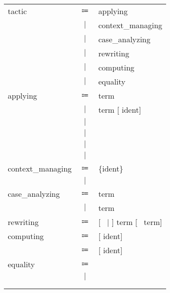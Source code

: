 \begin{table}[!htb]
    \centering\sl
    \begin{tabular}{lcl}
        tactic
            &$\Coloneqq$&applying\\
            &$\mid$&context\_managing\\
            &$\mid$&case\_analyzing\\
            &$\mid$&rewriting\\
            &$\mid$&computing\\
            &$\mid$&equality\\
        applying
            &$\Coloneqq$&\fexact{} term\\
            &$\mid$&\fapply{} term [\fin{} ident]\\
            &$\mid$&\fleft{}\\
            &$\mid$&\fright{}\\
            &$\mid$&\fsplit{}\\
            &$\mid$&\fexists{}\\
        context\_managing
            &$\Coloneqq$&\fintro{} \{ident\}\\
            &$\mid$&\fintros{}\\
        case\_analyzing
            &$\Coloneqq$&\fdestruct{} term\\
            &$\mid$&\finduction{} term\\
        rewriting
            &$\Coloneqq$&\frewrite{} [~\larrow{} $\mid$ \sarrow{}] term [~\fin{} term]\\
        computing
            &$\Coloneqq$&\fsimpl{} [\fin{} ident]\\
            &$\Coloneqq$&\funfold{} [\fin{} ident]\\
        equality
            &$\Coloneqq$&\freflexivity{}\\
            &$\mid$&\fsymmetry{}\\\\\\
    \end{tabular}
\end{table}
